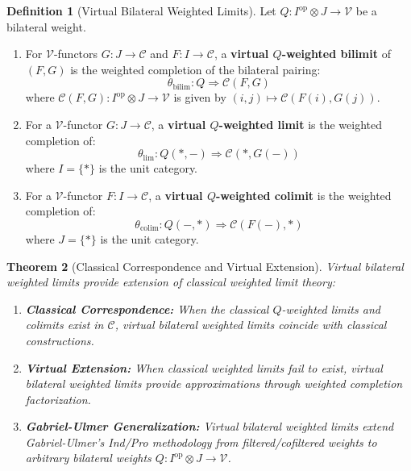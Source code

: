 \documentclass[11pt]{article}
\theoremstyle{plain}
\newtheorem{theorem}{Theorem}[section]
\theoremstyle{definition}
\newtheorem{definition}[theorem]{Definition}
\theoremstyle{remark}
\newcommand{\V}{\mathcal{V}}
\newcommand{\C}{\mathcal{C}}
\newcommand{\op}{\mathrm{op}}
\newcommand{\colim}{\mathrm{colim}}
\renewcommand{\lim}{\mathrm{lim}}
\begin{document}
\begin{definition}[Virtual Bilateral Weighted Limits]\label{def:virtual-limits}
Let $Q : I^{\op} \otimes J \to \V$ be a bilateral weight.

\begin{enumerate}
\item For $\V$-functors $G : J \to \C$ and $F : I \to \C$, a \textbf{virtual $Q$-weighted bilimit} of $(F, G)$ is the weighted completion of the bilateral pairing:
$$\theta_{\mathrm{bilim}} : Q \Rightarrow \C(F, G)$$
where $\C(F, G) : I^{\op} \otimes J \to \V$ is given by $(i, j) \mapsto \C(F(i), G(j))$.

\item For a $\V$-functor $G : J \to \C$, a \textbf{virtual $Q$-weighted limit} is the weighted completion of:
$$\theta_{\lim} : Q(\ast, -) \Rightarrow \C(\ast, G(-))$$
where $I = \{\ast\}$ is the unit category.

\item For a $\V$-functor $F : I \to \C$, a \textbf{virtual $Q$-weighted colimit} is the weighted completion of:
$$\theta_{\colim} : Q(-, \ast) \Rightarrow \C(F(-), \ast)$$
where $J = \{\ast\}$ is the unit category.
\end{enumerate}
\end{definition}

\begin{theorem}[Classical Correspondence and Virtual Extension]\label{thm:virtual-correspondence}
Virtual bilateral weighted limits provide extension of classical weighted limit theory:

\begin{enumerate}
\item \textbf{Classical Correspondence:} When the classical $Q$-weighted limits and colimits exist in $\C$, virtual bilateral weighted limits coincide with classical constructions.

\item \textbf{Virtual Extension:} When classical weighted limits fail to exist, virtual bilateral weighted limits provide approximations through weighted completion factorization.

\item \textbf{Gabriel-Ulmer Generalization:} Virtual bilateral weighted limits extend Gabriel-Ulmer's Ind/Pro methodology from filtered/cofiltered weights to arbitrary bilateral weights $Q : I^{\op} \otimes J \to \V$.
\end{enumerate}
\end{theorem}
\end{document}
